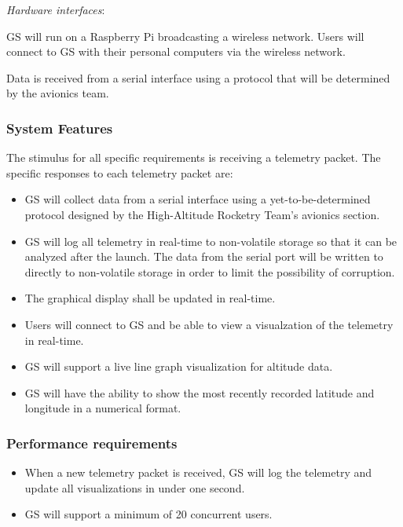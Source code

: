 \documentclass[10pt,draftclsnofoot,onecolumn]{IEEEtran}
\newcommand{\subsubsubsection}[1]{
	\hfill\break\textit{#1}:
}
\begin{document}
	\subsubsubsection{Hardware interfaces}
	GS will run on a Raspberry Pi broadcasting a wireless network. Users will connect to GS with their personal computers
	via the wireless network.

	Data is received from a serial interface using a protocol that will be determined by the avionics team.

	\subsubsection{System Features}

	The stimulus for all specific requirements is receiving a telemetry packet. The specific responses to each telemetry packet are:
	\begin{itemize}
		\item GS will collect data from a serial interface using a yet-to-be-determined protocol designed by the High-Altitude Rocketry Team's avionics section.
		\item GS will log all telemetry in real-time to non-volatile storage so that it can be analyzed
		after the launch.
		The data from the serial port will be written to directly to non-volatile storage in order to limit
		the possibility of corruption.
		\item The graphical display shall be updated in real-time.
		\item Users will connect to GS and be able to view a visualzation of the telemetry in real-time.
		\item GS will support a live line graph visualization for altitude data.
		\item GS will have the ability to show the most recently recorded latitude and longitude in a numerical format.
	\end{itemize}

	\subsubsection{Performance requirements}

	\begin{itemize}
		\item When a new telemetry packet is received, GS will log the telemetry and update all visualizations in under one second.
		\item GS will support a minimum of 20 concurrent users.
	\end{itemize}
\end{document}
